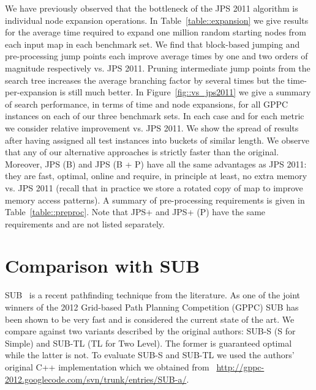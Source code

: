 We have previously observed that the bottleneck of the JPS 2011 algorithm is individual node
expansion operations. In Table~\ref{table::expansion} we give results for the average
time required to expand one million random starting nodes from each input map in
each benchmark set. We find that block-based jumping and pre-processing jump points
each improve average times by one and two orders of magnitude respectively vs. JPS 2011.
Pruning intermediate jump points from the search tree increases the average branching 
factor by several times but the time-per-expansion is still much better. 
In Figure~\ref{fig::vs_jps2011} we give a summary of search performance, in terms
of time and node expansions, for all GPPC instances on each of our three benchmark sets. 
In each case and for each metric we consider relative improvement vs. JPS 2011.
We show the spread of results after having assigned all test instances into buckets of 
similar length.
We observe that any of our alternative approaches is strictly faster than the original. 
Moreover, JPS (B) and JPS (B + P) have all the same advantages as JPS 2011: they are 
fast, optimal, online and require, in principle at least, no extra memory vs. JPS 2011
(recall that in practice we store a rotated copy of map to improve memory access
patterns).
A summary of pre-processing requirements is given in Table~\ref{table::preproc}. Note
that JPS+ and JPS+ (P) have the same requirements and are not listed separately.


\section{Comparison with SUB}
SUB~\cite{urasKH13} is a recent pathfinding technique from the literature.
As one of the joint winners of the 2012 Grid-based Path Planning Competition (GPPC) 
SUB has been shown to be very fast and is considered the current state of the art.
We compare against two variants described by the original authors: SUB-S (S
for Simple) and SUB-TL (TL for Two Level). The former is guaranteed optimal
while the latter is not.  To evaluate SUB-S and SUB-TL we used the authors'
original C++ implementation which we obtained from~{\small
\url{http://gppc-2012.googlecode.com/svn/trunk/entries/SUB-a/}}.


